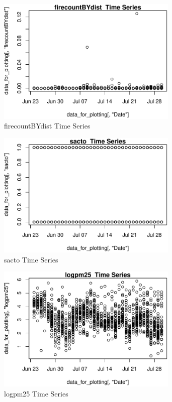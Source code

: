 \begin{figure} 
\centering  
\includegraphics[width=0.77\textwidth]{Code_Outputs/ML_input_report_AllforCaret_cleaned_StepPractice_part_practice_firecountBYdistTS.pdf} 
\caption{\label{fig:ML_input_report_AllforCaret_cleaned_StepPractice_part_practicefirecountBYdistTS}firecountBYdist  Time Series} 
\end{figure} 
 

\begin{figure} 
\centering  
\includegraphics[width=0.77\textwidth]{Code_Outputs/ML_input_report_AllforCaret_cleaned_StepPractice_part_practice_sactoTS.pdf} 
\caption{\label{fig:ML_input_report_AllforCaret_cleaned_StepPractice_part_practicesactoTS}sacto  Time Series} 
\end{figure} 
 

\begin{figure} 
\centering  
\includegraphics[width=0.77\textwidth]{Code_Outputs/ML_input_report_AllforCaret_cleaned_StepPractice_part_practice_logpm25TS.pdf} 
\caption{\label{fig:ML_input_report_AllforCaret_cleaned_StepPractice_part_practicelogpm25TS}logpm25  Time Series} 
\end{figure} 
 

